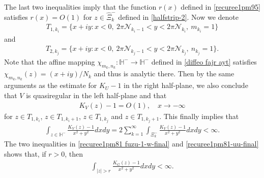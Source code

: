 \documentclass[12pt]{amsart}
\numberwithin{equation}{section}
\begin{document}
The last two inequalities imply that the function $r(x)$ defined in \eqref{recuree1pm95} satisfies $r(x)=O(1)$ for $z\in \hat{\Xi}_k^{-}$ defined in \eqref{halfstrip-2}. Now we denote
\begin{equation*}%
\begin{split}
T_{1,k_i}=\{x+iy: x<0, \ 2\pi\mathcal{N}_{k_i-1}<y<2\pi \mathcal{N}_{k_i}, \ m_{k_i}=1\}
\end{split}
\end{equation*}
and
\begin{equation*}%
\begin{split}
T_{2,k_j}=\{x+iy: x<0, \ 2\pi\mathcal{N}_{k_j-1}<y<2\pi \mathcal{N}_{k_j}, \ n_{k_j}=1\}.
\end{split}
\end{equation*}
Note that the affine mapping $\chi_{m_k,n_k}:\mathbb{H}^{-}\to \mathbb{H}^{-}$ defined in \eqref{diffeo  fajr  ayt} satisfies $\chi_{m_k,n_k}(z)=(x+iy)/N_k$ and thus is analytic there. Then by the same arguments as the estimate for $K_U-1$ in the right half-plane, we also conclude that $V$ is quasiregular in the left half-plane and that
\begin{equation*}%
\begin{split}
K_V(z)-1=O(1), \quad x\to-\infty
\end{split}
\end{equation*}
for $z\in T_{1,k_i}$, $z\in T_{1,k_i+1}$, $z\in T_{1,k_j}$ and $z\in T_{1,k_j+1}$. This finally implies that
\begin{equation}\label{recuree1pm81-uu-final}
\begin{split}
\int_{z\in \mathbb{H}^{-}}\frac{K_V(z)-1}{x^2+y^2}dxdy =2\sum_{k=1}^{\infty}\int_{\Xi_k^{-}}\frac{K_V(z)-1}{x^2+y^2}dxdy <\infty.
\end{split}
\end{equation}
The two inequalities in \eqref{recuree1pm81 fuzu-1-w-final} and \eqref{recuree1pm81-uu-final} shows that, if $r>0$, then
\begin{equation}\label{recuree1pm116}
\begin{split}
\int_{|z|>r}\frac{K_G(z)-1}{x^2+y^2}dxdy <\infty.
\end{split}
\end{equation}
\end{document}

